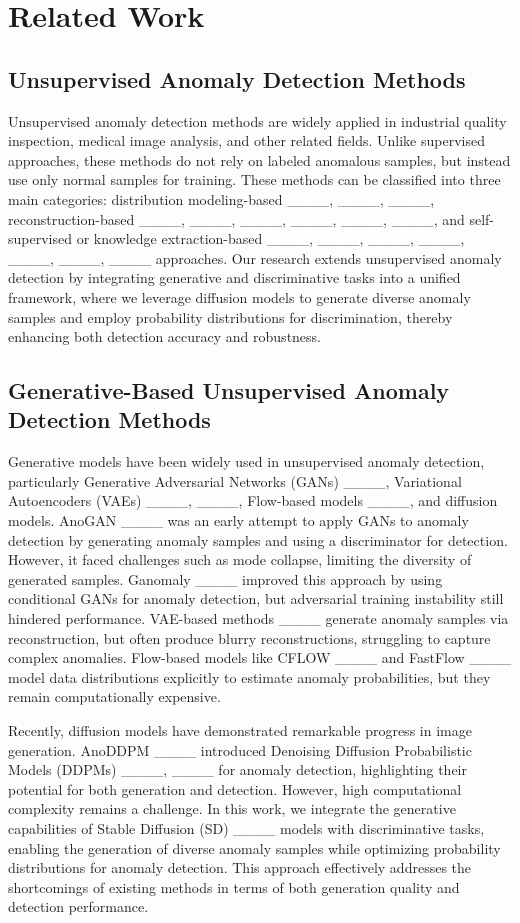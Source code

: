 \section{Related Work}
\subsection{Unsupervised Anomaly Detection Methods}

Unsupervised anomaly detection methods are widely applied in industrial quality inspection, medical image analysis, and other related fields. Unlike supervised approaches, these methods do not rely on labeled anomalous samples, but instead use only normal samples for training. These methods can be classified into three main categories: distribution modeling-based ____, ____, ____, reconstruction-based ____, ____, ____, ____, ____, ____, and self-supervised or knowledge extraction-based ____, ____, ____, ____, ____, ____, ____ approaches. Our research extends unsupervised anomaly detection by integrating generative and discriminative tasks into a unified framework, where we leverage diffusion models to generate diverse anomaly samples and employ probability distributions for discrimination, thereby enhancing both detection accuracy and robustness.

\subsection{Generative-Based Unsupervised Anomaly Detection Methods}

Generative models have been widely used in unsupervised anomaly detection, particularly Generative Adversarial Networks (GANs) ____, Variational Autoencoders (VAEs) ____, ____, Flow-based models ____, and diffusion models. AnoGAN ____ was an early attempt to apply GANs to anomaly detection by generating anomaly samples and using a discriminator for detection. However, it faced challenges such as mode collapse, limiting the diversity of generated samples. Ganomaly ____ improved this approach by using conditional GANs for anomaly detection, but adversarial training instability still hindered performance. VAE-based methods ____ generate anomaly samples via reconstruction, but often produce blurry reconstructions, struggling to capture complex anomalies. Flow-based models like CFLOW ____ and FastFlow ____ model data distributions explicitly to estimate anomaly probabilities, but they remain computationally expensive.

Recently, diffusion models have demonstrated remarkable progress in image generation. AnoDDPM ____ introduced Denoising Diffusion Probabilistic Models (DDPMs) ____, ____ for anomaly detection, highlighting their potential for both generation and detection. However, high computational complexity remains a challenge. In this work, we integrate the generative capabilities of Stable Diffusion (SD) ____ models with discriminative tasks, enabling the generation of diverse anomaly samples while optimizing probability distributions for anomaly detection. This approach effectively addresses the shortcomings of existing methods in terms of both generation quality and detection performance.

